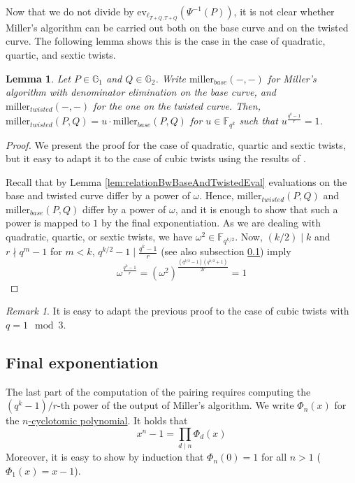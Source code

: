 \documentclass{article}
\newcommand{\gOne}{\mathbb{G}_1}
\newcommand{\gTwo}{\mathbb{G}_2}
\newcommand{\ev}{\mathrm{ev}}
\newcommand{\fq}[1]{\mathbb{F}_{q^{#1}}}
\theoremstyle{remark}
\newtheorem{remark}{Remark}[section]
\theoremstyle{plain}
\newtheorem{lemma}{Lemma}[section]
\begin{document}
Now that we do not divide by $\ev_{\ell_{T+Q,T+Q}}(\Psi^{-1}(P))$, it is not clear whether Miller's algorithm can be carried out both on the base curve and on the twisted curve.
The following lemma shows this is the case in the case of quadratic, quartic, and sextic twists.

\begin{lemma}
    Let $P \in \gOne$ and $Q \in \gTwo$.
    Write $\mathrm{miller}_{base}(-,-)$ for Miller's algorithm with denominator elimination on the base curve, and $\mathrm{miller}_{twisted}(-,-)$ for the one on the twisted curve.
    Then, $\mathrm{miller}_{twisted}(P,Q) = u \cdot \mathrm{miller}_{base}(P,Q)$ for $u \in \fq{k}$ such that $u^{\frac{q^k-1}{r}} = 1$.
\end{lemma}

\begin{proof}
    We present the proof for the case of quadratic, quartic and sextic twists, but it easy to adapt it to the case of cubic twists using the results of \cite{LZZW-cubic-den-elim}.

    Recall that by Lemma \ref{lem:relationBwBaseAndTwistedEval} evaluations on the base and twisted curve differ by a power of $\omega$.
    Hence, $\mathrm{miller}_{twisted}(P,Q)$ and $\mathrm{miller}_{base}(P,Q)$ differ by a power of $\omega$, and it is enough to show that such a power is mapped to $1$ by the final exponentiation.
    As we are dealing with quadratic, quartic, or sextic twists, we have $\omega^2 \in \fq{k/2}$.
    Now, $(k/2) \mid k$ and $r \nmid q^m - 1$ for $m < k$, $q^{k/2} - 1 \mid \frac{q^k - 1}{r}$ (see also subsection \ref{subsect:finalexponentiation}) imply
    \[
        \omega^{\frac{q^k-1}{r}} = \left( \omega^2 \right)^{\frac{(q^{k/2}-1)(q^{k/2}+1)}{2r}} = 1
    \]
\end{proof}

\begin{remark}
    It is easy to adapt the previous proof to the case of cubic twists with $q = 1 \mod 3$.
\end{remark}

\subsection{Final exponentiation}
\label{subsect:finalexponentiation}

The last part of the computation of the pairing requires computing the $(q^k - 1)/r$-th power of the output of Miller's algorithm.
We write $\Phi_n(x)$ for the \href{https://en.wikipedia.org/wiki/Cyclotomic_polynomial}{$n$-cyclotomic polynomial}.
It holds that
\[
    x^n - 1 = \prod_{d \mid n} \Phi_d(x)
\]
Moreover, it is easy to show by induction that $\Phi_n(0) = 1$ for all $n > 1$ ($\Phi_1(x) = x - 1$).
\end{document}
